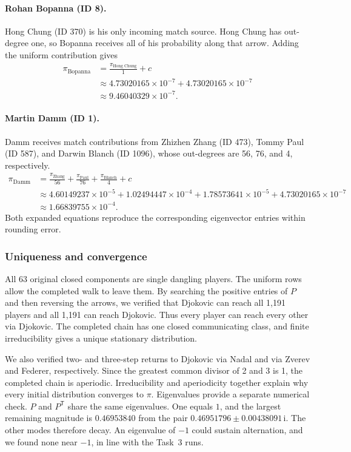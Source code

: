 \paragraph{Rohan Bopanna (ID 8).}
Hong Chung (ID 370) is his only incoming match source. Hong Chung has
out-degree one, so Bopanna receives all of his probability along that arrow.
Adding the uniform contribution gives
\[
\begin{aligned}
\pi_{\text{Bopanna}}
&=\frac{\pi_{\text{Hong Chung}}}{1}+c\\
&\approx 4.73020165\times10^{-7}+4.73020165\times10^{-7}\\
&\approx 9.46040329\times10^{-7}.
\end{aligned}
\]

\paragraph{Martin Damm (ID 1).}
Damm receives match contributions from Zhizhen Zhang (ID 473),
Tommy Paul (ID 587), and Darwin Blanch (ID 1096), whose out-degrees
are 56, 76, and 4, respectively.
\[
\begin{aligned}
\pi_{\text{Damm}}
&=\frac{\pi_{\text{Zhang}}}{56}+\frac{\pi_{\text{Paul}}}{76}
  +\frac{\pi_{\text{Blanch}}}{4}+c\\
&\approx 4.60149237\times10^{-5}+1.02494447\times10^{-4}
  +1.78573641\times10^{-5}+4.73020165\times10^{-7}\\
&\approx 1.66839755\times10^{-4}.
\end{aligned}
\]
Both expanded equations reproduce the corresponding eigenvector entries
within rounding error.

\subsubsection*{Uniqueness and convergence}

All 63 original closed components are single dangling players.
The uniform rows allow the completed walk to leave them. By searching the
positive entries of \(P\) and then reversing the arrows, we verified that
Djokovic can reach all 1,191 players and all 1,191 can reach Djokovic.
Thus every player can reach every other via Djokovic. The completed chain
has one closed communicating class, and finite irreducibility gives a
unique stationary distribution.

We also verified two- and three-step returns to Djokovic via Nadal and
via Zverev and Federer, respectively. Since the greatest common divisor of
2 and 3 is 1, the completed chain is aperiodic. Irreducibility and
aperiodicity together explain why every initial distribution converges
to \(\pi\). Eigenvalues provide a separate numerical check. \(P\) and
\(P^{\mathsf T}\) share the same eigenvalues. One equals \(1\), and the
largest remaining magnitude is \(0.46953840\) from the pair
\(0.46951796\pm0.00438091\,\mathrm{i}\). The other modes therefore decay.
An eigenvalue of \(-1\) could sustain alternation, and we found none
near \(-1\), in line with the Task~3 runs.


